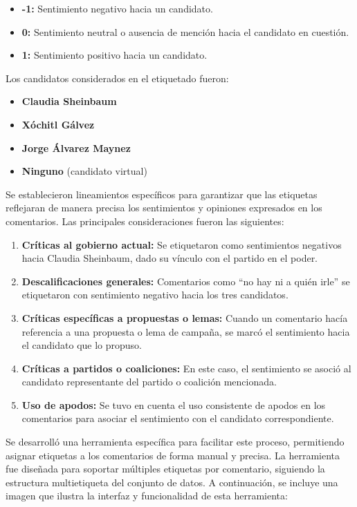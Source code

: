 \documentclass[10pt, a4paper]{article}
\begin{document}
	\begin{itemize}
		\item \textbf{-1:} Sentimiento negativo hacia un candidato.
		\item \textbf{0:} Sentimiento neutral o ausencia de mención hacia el candidato en cuestión.
		\item \textbf{1:} Sentimiento positivo hacia un candidato.
	\end{itemize}
	
	Los candidatos considerados en el etiquetado fueron:
	\begin{itemize}
		\item \textbf{Claudia Sheinbaum}
		\item \textbf{Xóchitl Gálvez}
		\item \textbf{Jorge Álvarez Maynez}
		\item \textbf{Ninguno} (candidato virtual)
	\end{itemize}
	
	
	Se establecieron lineamientos específicos para garantizar que las etiquetas reflejaran de manera precisa los sentimientos y opiniones expresados en los comentarios. Las principales consideraciones fueron las siguientes:
	
	\begin{enumerate}
		\item \textbf{Críticas al gobierno actual:} Se etiquetaron como sentimientos negativos hacia Claudia Sheinbaum, dado su vínculo con el partido en el poder.
		\item \textbf{Descalificaciones generales:} Comentarios como ``no hay ni a quién irle'' se etiquetaron con sentimiento negativo hacia los tres candidatos.
		\item \textbf{Críticas específicas a propuestas o lemas:} Cuando un comentario hacía referencia a una propuesta o lema de campaña, se marcó el sentimiento hacia el candidato que lo propuso.
		\item \textbf{Críticas a partidos o coaliciones:} En este caso, el sentimiento se asoció al candidato representante del partido o coalición mencionada.
		\item \textbf{Uso de apodos:} Se tuvo en cuenta el uso consistente de apodos en los comentarios para asociar el sentimiento con el candidato correspondiente.
	\end{enumerate}
	
	
	Se desarrolló una herramienta específica para facilitar este proceso, permitiendo asignar etiquetas a los comentarios de forma manual y precisa. La herramienta fue diseñada para soportar múltiples etiquetas por comentario, siguiendo la estructura multietiqueta del conjunto de datos. A continuación, se incluye una imagen que ilustra la interfaz y funcionalidad de esta herramienta:
	
\end{document}
